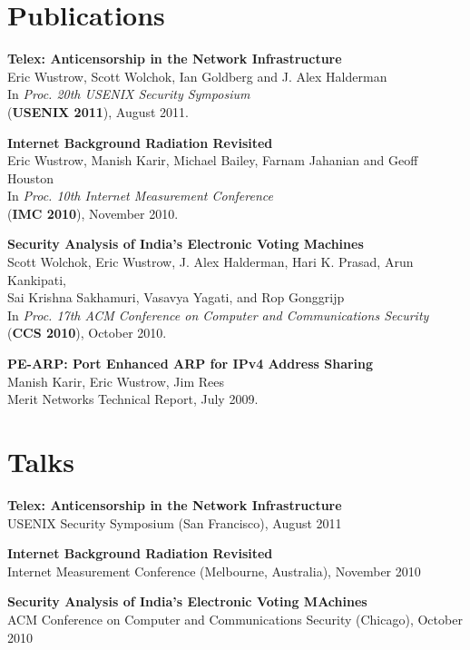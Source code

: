 \documentclass{res}
\begin{document}
\begin{resume}
\section{Publications}
    \textbf{Telex: Anticensorship in the Network Infrastructure} \\
    Eric Wustrow, Scott Wolchok, Ian Goldberg and J. Alex Halderman \\
    In \emph{Proc. 20th USENIX Security Symposium} \\
    (\textbf{USENIX 2011}), August 2011.

	\textbf{Internet Background Radiation Revisited} \\
	Eric Wustrow, Manish Karir, Michael Bailey, Farnam Jahanian and Geoff Houston \\
	In \emph{Proc. 10th Internet Measurement Conference} \\
	(\textbf{IMC 2010}), November 2010.
	
	\textbf{Security Analysis of India's Electronic Voting  Machines} \\ 
	Scott Wolchok, Eric Wustrow, J. Alex Halderman, Hari K. Prasad, Arun Kankipati, \\
	Sai Krishna Sakhamuri, Vasavya Yagati, and Rop Gonggrijp \\
	In \emph{Proc. 17th ACM Conference on Computer and Communications 
	Security} \\
	(\textbf{CCS 2010}), October 2010.

	\textbf{PE-ARP: Port Enhanced ARP for IPv4 Address Sharing} \\
	Manish Karir, Eric Wustrow, Jim Rees \\
	Merit Networks Technical Report, July 2009.	

\section{Talks}
    \textbf{Telex: Anticensorship in the Network Infrastructure} \\
    USENIX Security Symposium (San Francisco), August 2011

    \textbf{Internet Background Radiation Revisited} \\
    Internet Measurement Conference (Melbourne, Australia), November 2010

    \textbf{Security Analysis of India's Electronic Voting MAchines} \\ 
    ACM Conference on Computer and Communications Security (Chicago), October 2010


\end{resume}
\end{document}
